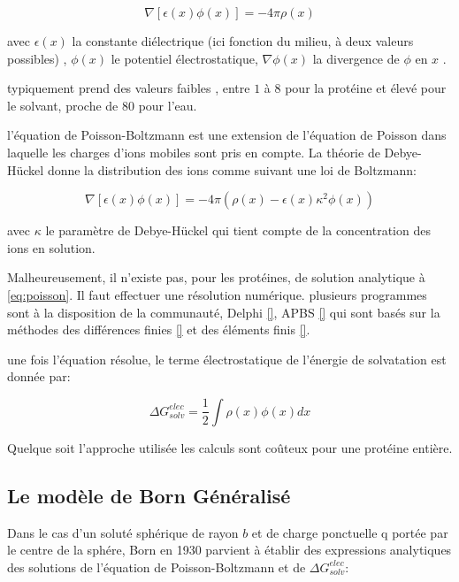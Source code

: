 \begin{equation}
  \label{eq:poisson}
  \nabla [ \epsilon(x) \phi(x)] = - 4 \pi \rho(x)   
\end{equation}

avec $\epsilon(x)$ la constante diélectrique (ici fonction du milieu, à deux valeurs possibles) , $\phi (x)$ le potentiel électrostatique, $\nabla \phi(x)$ la divergence de $\phi$ en $x$ .

typiquement \epsilon prend des valeurs faibles , entre $1$ à $8$ pour la protéine et élevé pour le solvant, proche de $80$ pour l'eau.

l'équation de Poisson-Boltzmann est une extension de l'équation de Poisson dans laquelle les charges d'ions mobiles sont pris en compte. La théorie de Debye-Hückel donne la distribution des ions comme suivant une loi de Boltzmann:

\begin{equation}
  \nabla [ \epsilon (x) \phi(x)] = -4 \pi ( \rho(x) - \epsilon(x) \kappa^2 \phi(x))
\end{equation}

avec $ \kappa $ le paramètre de Debye-Hückel qui tient compte de la concentration des ions en solution.


Malheureusement, il n'existe pas, pour les protéines, de solution analytique à \ref{eq:poisson}. Il faut effectuer une résolution numérique. plusieurs programmes sont à la disposition de la communauté, Delphi \ref{}, APBS \ref{}  qui sont basés sur la méthodes des différences finies \ref{} et des éléments finis \ref{}.

une fois l'équation résolue, le terme électrostatique de l'énergie de solvatation est donnée par:

\begin{equation}
\Delta G_{solv}^{elec} = \frac{1}{2} \int \rho(x)\phi(x)dx  
\end{equation}

Quelque soit l'approche utilisée les calculs sont coûteux pour une protéine entière.


\subsection{Le modèle de Born Généralisé}
\label{sub:GB}
Dans le cas d'un soluté sphérique de rayon $b$ et de charge ponctuelle q portée par le centre de la sphére, Born en 1930  parvient à établir des expressions analytiques des solutions de l'équation de Poisson-Boltzmann et de $ \Delta G_{solv}^{elec}$:


